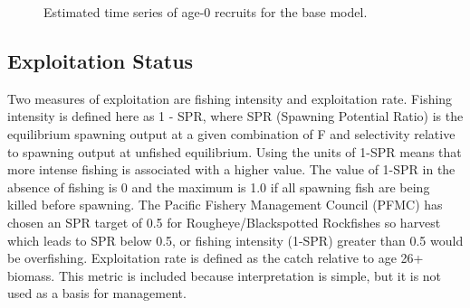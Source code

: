 \documentclass[
]{scrartcl}
\begin{document}
\endgroup

\begin{figure}[H]


\caption{\label{fig-es-recruits}Estimated time series of age-0 recruits
for the base model.}

\end{figure}%

\subsection{Exploitation Status}\label{exploitation-status}

Two measures of exploitation are fishing intensity and exploitation
rate. Fishing intensity is defined here as 1 - SPR, where SPR (Spawning
Potential Ratio) is the equilibrium spawning output at a given
combination of F and selectivity relative to spawning output at unfished
equilibrium. Using the units of 1-SPR means that more intense fishing is
associated with a higher value. The value of 1-SPR in the absence of
fishing is 0 and the maximum is 1.0 if all spawning fish are being
killed before spawning. The Pacific Fishery Management Council (PFMC)
has chosen an SPR target of 0.5 for Rougheye/Blackspotted Rockfishes so
harvest which leads to SPR below 0.5, or fishing intensity (1-SPR)
greater than 0.5 would be overfishing. Exploitation rate is defined as
the catch relative to age 26+ biomass. This metric is included because
interpretation is simple, but it is not used as a basis for management.
\end{document}
